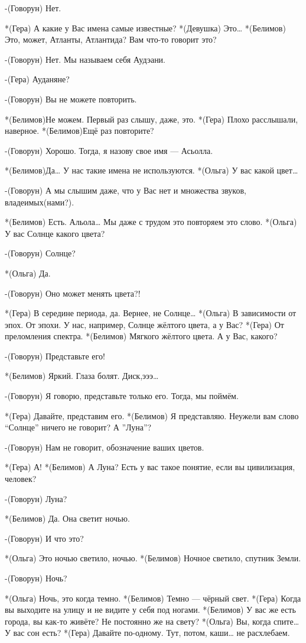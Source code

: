 -(Говорун) Нет.

*(Гера) А какие у Вас имена самые известные?
*(Девушка) Это…
*(Белимов) Это, может, Атланты, Атлантида?  Вам что-то говорит это?

-(Говорун) Нет. Мы называем себя Аудэани. 

-(Гера) Ауданяне?

-(Говорун) Вы не можете повторить.

*(Белимов)Не можем. Первый раз слышу, даже, это.
*(Гера) Плохо расслышали,  наверное.
*(Белимов)Ещё раз повторите?

-(Говорун) Хорошо. Тогда, я назову свое имя — Асьолла.


*(Белимов)Да… У нас такие имена не используются.
*(Ольга) У вас какой цвет…

-(Говорун) А мы слышим даже, что у Вас нет  и множества звуков, владеимых(нами?).

*(Белимов) Есть. Альола…  Мы даже с трудом это повторяем это слово.
*(Ольга) У вас Солнце какого цвета?

-(Говорун) Солнце?

*(Ольга) Да.

-(Говорун) Оно может менять цвета?!

*(Гера) В середине периода, да. Вернее, не Солнце…
*(Ольга) В зависимости от эпох. От эпохи. У нас, например, Солнце жёлтого цвета, а у Вас?
*(Гера) От преломления спектра.
*(Белимов) Мягкого жёлтого цвета. А у Вас, какого?

-(Говорун) Представьте его!

*(Белимов) Яркий. Глаза болят. Диск,эээ…

-(Говорун) Я говорю, представьте только его. Тогда, мы поймём.

*(Гера) Давайте, представим его.
*(Белимов) Я представляю. Неужели вам слово “Солнце” ничего не говорит? А ”Луна”?

-(Говорун) Нам не говорит, обозначение ваших цветов.

*(Гера) А!
*(Белимов) А Луна? Есть у вас такое понятие, если вы цивилизация, человек?

-(Говорун) Луна?

*(Белимов) Да. Она светит ночью.

-(Говорун) И что это?

*(Ольга) Это ночью светило, ночью.
*(Белимов) Ночное светило, спутник Земли.

-(Говорун) Ночь?

*(Ольга) Ночь, это когда темно.
*(Белимов) Темно — чёрный свет.
*(Гера) Когда вы выходите на улицу и не видите у себя под ногами.
*(Белимов) У вас же есть города,  вы  как-то живёте? Не постоянно же на свету?
*(Ольга) Вы, когда спите… У вас сон есть?
*(Гера) Давайте по-одному. Тут, потом, каши… не расхлебаем.

